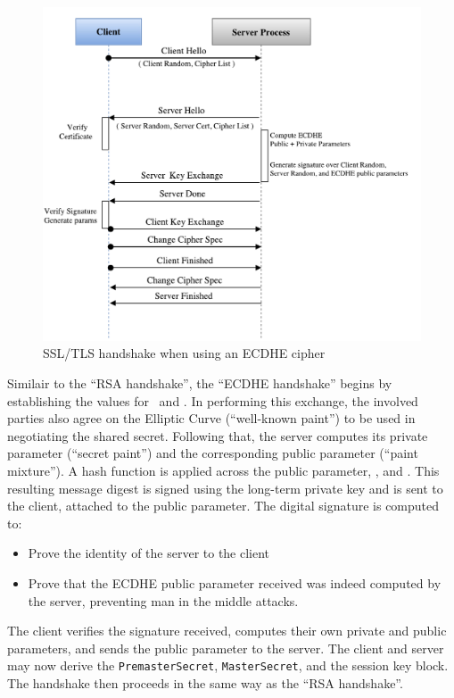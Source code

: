 \documentclass[../../main.tex]{subfiles}
\begin{document}
\begin{figure}[H]
  \centering
  \includegraphics[scale=0.4]{images/EC-DHE-Handshake-pristine.pdf}
  \caption[``ECDHE handshake'']{SSL/TLS handshake when using an ECDHE
    cipher}
  \label{fig:ecdhe-pristine}
\end{figure}

Similair to the ``RSA handshake'', the ``ECDHE handshake'' begins by
establishing the values for \crandom~and \srandom. In performing this
exchange, the involved parties also agree on the Elliptic Curve
(``well-known paint'') to be used in negotiating the shared secret.
Following that, the server computes its private parameter (``secret
paint'') and the corresponding public parameter (``paint mixture''). A
hash function is applied across the public parameter, \srandom, and
\crandom. This resulting message digest is signed using the long-term
private key and is sent to the client, attached to the public
parameter. The digital signature is computed to:
\begin{itemize}
  \item Prove the identity of the server to the client
  \item Prove that the ECDHE public parameter received was indeed
    computed by the server, preventing man in the middle attacks. 
\end{itemize}
The client verifies the signature received, computes their own private
and public parameters, and sends the public parameter to the server.
The client and server may now derive the \texttt{PremasterSecret},
\texttt{MasterSecret}, and the session key block. The handshake then
proceeds in the same way as the ``RSA handshake''.
\end{document}
